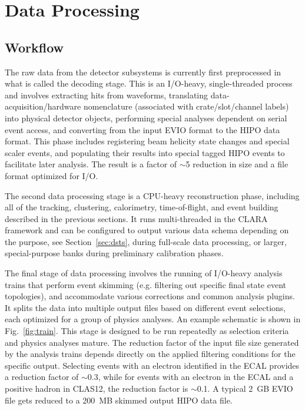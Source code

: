 \section{Data Processing}
\label{sec:dataproc}

\subsection{Workflow}

The raw data from the detector subsystems is currently first preprocessed in what is called the decoding
stage. This is an I/O-heavy, single-threaded process and involves extracting hits from waveforms, translating
data-acquisition/hardware nomenclature (associated with crate/slot/channel labels) into physical detector objects,
performing special analyses dependent on serial event access, and converting from the input EVIO format to the
HIPO data format.  This phase includes registering beam helicity state changes and special scaler events, and
populating their results into special tagged HIPO events to facilitate later analysis.  The result is a factor of
$\sim$5 reduction in size and a file format optimized for I/O.

The second data processing stage is a CPU-heavy reconstruction phase, including all of the tracking, clustering,
calorimetry, time-of-flight, and event building described in the previous sections.  It runs multi-threaded in the
CLARA framework and can be configured to output various data schema depending on the purpose, see
Section~\ref{sec:dsts}, during full-scale data processing, or larger, special-purpose banks during preliminary
calibration phases.

The final stage of data processing involves the running of I/O-heavy analysis trains that perform event skimming
(e.g. filtering out specific final state event topologies),  and accommodate various corrections and common analysis
plugins.  It splits the data into multiple output files based on different event selections, each optimized for a
group of physics analyses. An example schematic is shown in Fig.~\ref{fig:train}. This stage is designed to be run
repeatedly as selection criteria and physics analyses mature. The reduction factor of the input file size generated
by the analysis trains depends directly on the applied filtering conditions for the specific output. Selecting events
with an electron identified in the ECAL provides a reduction factor of $\sim$0.3, while for events with an electron
in the ECAL and a positive hadron in CLAS12, the reduction factor is $\sim$0.1.  A typical 2~GB EVIO file gets
reduced to a 200~MB skimmed output HIPO data file.

